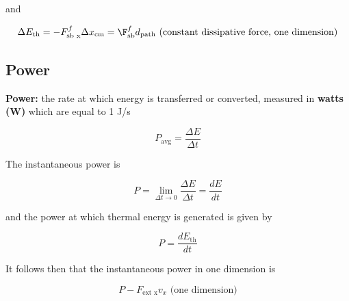         and

        \[
            \Delta E_{\text{th}} = -F^f_{\text{sb x}} \Delta x_{\text{cm}}  = \F^f_{\text{sb}} d_{\text{path}} \text{ (constant dissipative force, one dimension)}
        \]



    \subsection{Power}


        \textbf{Power:} the rate at which energy is transferred or converted, measured in \textbf{watts (W)} which are equal to 1 J/s

        \[
            P_{\text{avg}} = \frac{\Delta E}{\Delta t}
        \]

        The instantaneous power is

        \[
            P = \lim_{\Delta t \to 0} \frac{\Delta E}{\Delta t} = \frac{dE}{dt}
        \]

        and the power at which thermal energy is generated is given by

        \[
            P = \frac{dE_{\text{th}}}{dt}
        \]

        It follows then that the instantaneous power in one dimension is

        \[
            P - F_{\text{ext x}} v_x \text{ (one dimension)}
        \]

